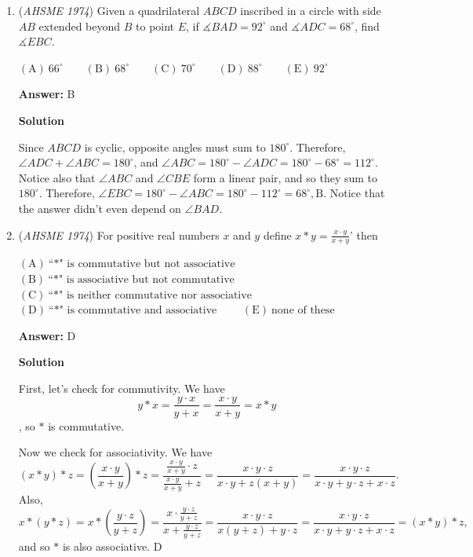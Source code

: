 \begin{enumerate}
\textbf{Solution 2}

Notice that $x^{51}+51$ is equal to $(x^{51}+1)+50$. Since $x^51+1=(x+1)(x^{50}-x^{49}+ \ldots +x^2 - x + 1)$, this part of the polynomial is divisible by $x+1$. Thus, the remainder is $\boxed{\textbf{(D)}~50}$.

 Note: the problem where this is linked is covered 1:30-1:55

 


	\item (\textit{AHSME 1974}) Given a quadrilateral $ABCD$ inscribed in a circle with side $AB$ extended beyond $B$ to point $E$, if $\measuredangle BAD=92^\circ$ and $\measuredangle ADC=68^\circ$, find $\measuredangle EBC$.


 $\mathrm{(A)\ } 66^\circ \qquad \mathrm{(B) \ }68^\circ \qquad \mathrm{(C) \  } 70^\circ \qquad \mathrm{(D) \  } 88^\circ \qquad \mathrm{(E) \  }92^\circ$

 \textbf{Answer: }B



\textbf{Solution}

Since $ABCD$ is cyclic, opposite angles must sum to $180^\circ$. Therefore, $\angle ADC+\angle ABC=180^\circ$, and $\angle ABC=180^\circ-\angle ADC=180^\circ-68^\circ=112^\circ$. Notice also that $\angle ABC$ and $\angle CBE$ form a linear pair, and so they sum to $180^\circ$. Therefore, $\angle EBC=180^\circ-\angle ABC=180^\circ-112^\circ=68^\circ, \boxed{\text{B}}$. Notice that the answer didn't even depend on $\angle BAD$.

 


	\item (\textit{AHSME 1974}) For positive real numbers $x$ and $y$ define $x*y=\frac{x\cdot y}{x+y}$' then


 $\mathrm{(A)\ } \text{``*" is commutative but not associative} \qquad$
$\mathrm{(B) \ }\text{``*" is associative but not commutative} \qquad$
$\mathrm{(C) \  } \text{``*" is neither commutative nor associative} \qquad$
$\mathrm{(D) \  } \text{``*" is commutative and associative} \qquad$
$\mathrm{(E) \  }\text{none of these} \qquad$

 \textbf{Answer: }D



\textbf{Solution}

First, let's check for commutivity. We have 
 \[y*x=\frac{y\cdot x}{y+x}=\frac{x\cdot y}{x+y}=x*y\], so $*$ is commutative.

 Now we check for associativity. We have 
 \[(x*y)*z=\left(\frac{x\cdot y}{x+y}\right)*z=\frac{\frac{x\cdot y}{x+y}\cdot z}{\frac{x\cdot y}{x+y}+z}=\frac{x\cdot y\cdot z}{x\cdot y+z(x+y)}=\frac{x\cdot y\cdot z}{x\cdot y+y\cdot z+x\cdot z}.\] Also, 
 \[x*(y*z)=x*\left(\frac{y\cdot z}{y+z}\right)=\frac{x\cdot\frac{y\cdot z}{y+z}}{x+\frac{y\cdot z}{y+z}}=\frac{x\cdot y\cdot z}{x(y+z)+y\cdot z}=\frac{x\cdot y\cdot z}{x\cdot y+y\cdot z+x\cdot z}=(x*y)*z ,\] and so $*$ is also associative. $\boxed{\text{D}}$




\end{enumerate}
